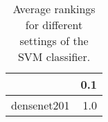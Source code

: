 \begin{table}[H]
\centering
\caption{Average rankings for different settings of the SVM classifier.}
\begin{tabular}{lr}
\toprule
{} &  0.1 \\
\midrule
densenet201 &  1.0 \\
\bottomrule
\end{tabular}
\label{tab:SVM}
\end{table}
